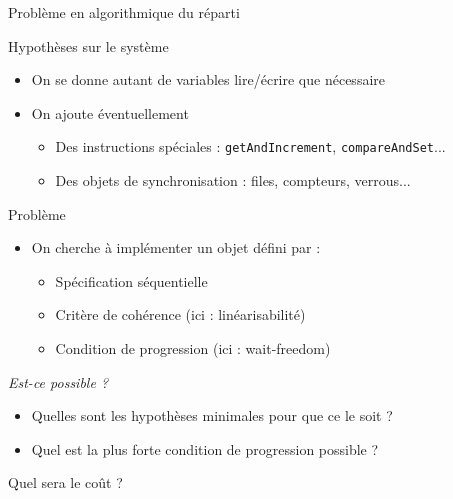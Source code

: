 
\begingroup

\begin{frame}[fragile]{Problème en algorithmique du réparti}

  \begin{block}{Hypothèses sur le système}
    \begin{itemize}
    \item On se donne autant de variables lire/écrire que nécessaire
    \item On ajoute éventuellement
      \begin{itemize}
      \item Des instructions spéciales : \lstinline{getAndIncrement}, \lstinline{compareAndSet}...
      \item Des objets de synchronisation : files, compteurs, verrous...
      \end{itemize}
    \end{itemize}
  \end{block}

  \pause

  \begin{block}{Problème}
    \begin{itemize}
    \item On cherche à implémenter un objet défini par :
      \begin{itemize}
      \item Spécification séquentielle
      \item Critère de cohérence (ici : linéarisabilité)
      \item Condition de progression (ici : wait-freedom)
      \end{itemize}
    \end{itemize}
    
  \end{block}

  \pause
  
  \begin{description}[Calculabilité :]
  \item[Calculabilité :] \emph{Est-ce possible ?}\\
  \end{description}
  \begin{itemize}
  \item Quelles sont les hypothèses minimales pour que ce le soit ?\\
  \item Quel est la plus forte condition de progression possible ?
  \end{itemize}
  \begin{description}[Calculabilité :]
  \item[Complexité :] Quel sera le coût ?
  \end{description}

\end{frame}

\endgroup
\endinput
